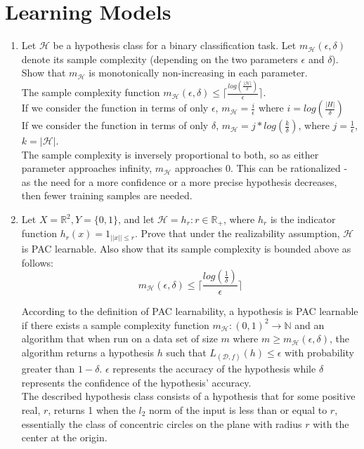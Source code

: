 \documentclass[12pt]{article}
\begin{document}
\section{Learning Models}
\begin{enumerate}
    \item Let $\mathcal{H}$ be a hypothesis class for a binary classification task. Let $m_\mathcal{H}(\epsilon,\delta)$ denote its sample complexity (depending on the two parameters $\epsilon$ and $\delta$). Show that $m_\mathcal{H}$ is monotonically non-increasing in each parameter.\\

    The sample complexity function $m_\mathcal{H}(\epsilon,\delta)\leq\lceil \frac{log(\frac{|\mathcal{H}|}{\delta})}{\epsilon}\rceil$. \\
    If we consider the function in terms of only $\epsilon$, $m_\mathcal{H}=\frac{i}{\epsilon}$ where $i=log(\frac{|H|}{\delta})$\\
    If we consider the function in terms of only $\delta$, $m_\mathcal{H}=j*log(\frac{k}{\delta})$, where $j=\frac{1}{\epsilon}$, $k=|\mathcal{H}|$.\\
    The sample complexity is inversely proportional to both, so as either parameter approaches infinity, $m_\mathcal{H}$ approaches 0. This can be rationalized - as the need for a more confidence or a more precise hypothesis decreases, then fewer training samples are needed.

    \item Let $X=\mathbb{R}^2, Y=\{0,1\}$, and let $\mathcal{H}=h_r:r\in \mathbb{R}_+$, where $h_r$ is the indicator function $h_r(x)=1_{||x||\leq r}$. Prove that under the realizability assumption, $\mathcal{H}$ is PAC learnable. Also show that its sample complexity is bounded above as follows:$$m_\mathcal{H}(\epsilon,\delta)\leq\lceil \frac{log(\frac{1}{\delta})}{\epsilon}\rceil$$

    According to the definition of PAC learnability, a hypothesis is PAC learnable if there exists a sample complexity function $m_\mathcal{H}:(0,1)^2\rightarrow\mathbb{N}$ and an algorithm that when run on a data set of size $m$ where $m\geq m_\mathcal{H}(\epsilon,\delta)$, the algorithm returns a hypothesis $h$ such that $L_{(\mathcal{D},f)}(h)\leq \epsilon$ with probability greater than $1-\delta$. $\epsilon$ represents the accuracy of the hypothesis while $\delta$ represents the confidence of the hypothesis' accuracy.\\

    The described hypothesis class consists of a hypothesis that for some positive real, $r$, returns 1 when the $l_2$ norm of the input is less than or equal to $r$, essentially the class of concentric circles on the plane with radius $r$ with the center at the origin.\\


\end{enumerate}
\end{document}
